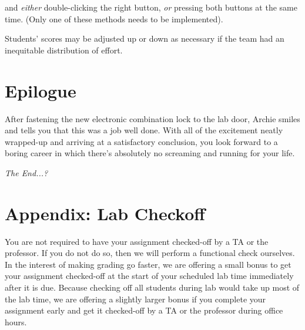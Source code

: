 \begin{description}
{    and \textit{either} double-clicking the right button, \textit{or} pressing
    both buttons at the same time. (Only one of these methods needs to be
    implemented).}
\end{description}

Students' scores may be adjusted up or down as necessary if the team had an
inequitable distribution of effort.

\section*{Epilogue}

After fastening the new electronic combination lock to the lab door, Archie
smiles and tells you that this was a job well done. With all of the excitement
neatly wrapped-up and arriving at a satisfactory conclusion, you look forward to
a boring career in which there's absolutely no screaming and running for your
life.

\textit{The End...?}



\section*{Appendix: Lab Checkoff}

You are not required to have your assignment checked-off by a TA or the
professor. If you do not do so, then we will perform a functional check
ourselves. In the interest of making grading go faster, we are offering a small
bonus to get your assignment checked-off at the start of your scheduled lab
time immediately after it is due. Because checking off all students during lab
would take up most of the lab time, we are offering a slightly larger bonus if
you complete your assignment early and get it checked-off by a TA or the
professor during office hours.

